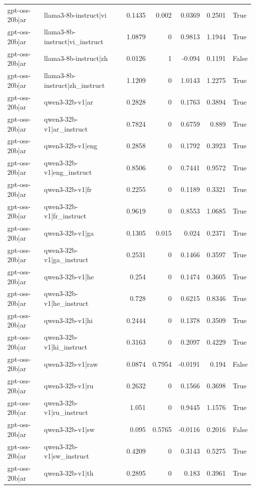 \begin{table}
\begin{tabular}{l l r r r r l}
gpt-oss-20b|ar & llama3-8b-instruct|vi & 0.1435 & 0.002 & 0.0369 & 0.2501 & True \\
gpt-oss-20b|ar & llama3-8b-instruct|vi_instruct & 1.0879 & 0 & 0.9813 & 1.1944 & True \\
gpt-oss-20b|ar & llama3-8b-instruct|zh & 0.0126 & 1 & -0.094 & 0.1191 & False \\
gpt-oss-20b|ar & llama3-8b-instruct|zh_instruct & 1.1209 & 0 & 1.0143 & 1.2275 & True \\
gpt-oss-20b|ar & qwen3-32b-v1|ar & 0.2828 & 0 & 0.1763 & 0.3894 & True \\
gpt-oss-20b|ar & qwen3-32b-v1|ar_instruct & 0.7824 & 0 & 0.6759 & 0.889 & True \\
gpt-oss-20b|ar & qwen3-32b-v1|eng & 0.2858 & 0 & 0.1792 & 0.3923 & True \\
gpt-oss-20b|ar & qwen3-32b-v1|eng_instruct & 0.8506 & 0 & 0.7441 & 0.9572 & True \\
gpt-oss-20b|ar & qwen3-32b-v1|fr & 0.2255 & 0 & 0.1189 & 0.3321 & True \\
gpt-oss-20b|ar & qwen3-32b-v1|fr_instruct & 0.9619 & 0 & 0.8553 & 1.0685 & True \\
gpt-oss-20b|ar & qwen3-32b-v1|ga & 0.1305 & 0.015 & 0.024 & 0.2371 & True \\
gpt-oss-20b|ar & qwen3-32b-v1|ga_instruct & 0.2531 & 0 & 0.1466 & 0.3597 & True \\
gpt-oss-20b|ar & qwen3-32b-v1|he & 0.254 & 0 & 0.1474 & 0.3605 & True \\
gpt-oss-20b|ar & qwen3-32b-v1|he_instruct & 0.728 & 0 & 0.6215 & 0.8346 & True \\
gpt-oss-20b|ar & qwen3-32b-v1|hi & 0.2444 & 0 & 0.1378 & 0.3509 & True \\
gpt-oss-20b|ar & qwen3-32b-v1|hi_instruct & 0.3163 & 0 & 0.2097 & 0.4229 & True \\
gpt-oss-20b|ar & qwen3-32b-v1|raw & 0.0874 & 0.7954 & -0.0191 & 0.194 & False \\
gpt-oss-20b|ar & qwen3-32b-v1|ru & 0.2632 & 0 & 0.1566 & 0.3698 & True \\
gpt-oss-20b|ar & qwen3-32b-v1|ru_instruct & 1.051 & 0 & 0.9445 & 1.1576 & True \\
gpt-oss-20b|ar & qwen3-32b-v1|sw & 0.095 & 0.5765 & -0.0116 & 0.2016 & False \\
gpt-oss-20b|ar & qwen3-32b-v1|sw_instruct & 0.4209 & 0 & 0.3143 & 0.5275 & True \\
gpt-oss-20b|ar & qwen3-32b-v1|th & 0.2895 & 0 & 0.183 & 0.3961 & True \\

\end{tabular}
\end{table}
